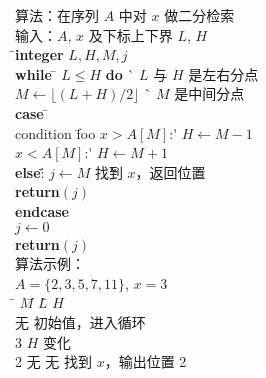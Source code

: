 \newcommand\kw{\textbf} %
\begin{tabbing}
\pushtabs
算法：在序列 $A$ 中对 $x$ 做二分检索 \\
输入：$A$, $x$ 及下标上下界 $L$, $H$ \\
\qquad\=\+\kw{integer} $L, H, M, j$ \\
\kw{while} \=\+ $L \leq H$ \kw{do} \` $L$ 与 $H$ 是左右分点 \\
           $M \gets \lfloor(L+H)/2\rfloor$ \` $M$ 是中间分点 \\
           \kw{case} \=\+\\
                   condition \= foo \+\kill
                   $x > A[M]$:\' $H \gets M-1$ \\
                   $x < A[M]$:\' $H \gets M+1$ \\
                    \kw{else}:\' \= $j \gets M$ \` 找到 $x$，返回位置\\
                                 \> \kw{return}$(j)$ \\
           \<\< \kw{endcase} \-\-\-\\
$j \gets 0$ \\
\kw{return}$(j)$ \-\\
\poptabs
算法示例：\\
$A = \{2, 3, 5, 7, 11\}$, $x=3$\\
\qquad\=\+ $M$\qquad \= $L$\qquad \= $H$\qquad \= \\
           无                          \> 初始值，进入循环 \\
           3                           \> $H$ 变化 \\
           2       \> 无      \> 无            \> 找到 $x$，输出位置 2
\end{tabbing}
